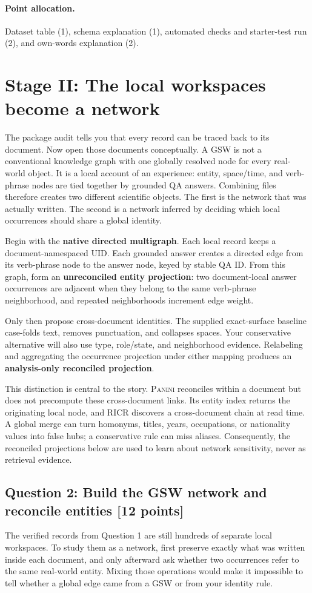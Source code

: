 \documentclass[11pt]{article}
\newcommand{\RICR}{{\mdseries\textsc{RICR}}\xspace}
\newcommand{\PANINI}{{\mdseries\textsc{Panini}}\xspace}
\newcommand{\question}[3]{%
  \subsection[Question #1: #2 (#3 points)]{Question #1: #2 \hfill [#3 points]}%
}
\newcommand{\grading}{\paragraph{Point allocation.}}
\begin{document}
\grading Dataset table (1), schema explanation (1), automated checks and
starter-test run (2), and own-words explanation (2).

\section{Stage II: The local workspaces become a network}

The package audit tells you that every record can be traced back to its
document. Now open those documents conceptually. A GSW is not a conventional
knowledge graph with one globally resolved node for every real-world object.
It is a local account of an experience: entity, space/time, and verb-phrase
nodes are tied together by grounded QA answers. Combining files therefore
creates two different scientific objects. The first is the network that was
actually written. The second is a network inferred by deciding which local
occurrences should share a global identity.

Begin with the \textbf{native directed multigraph}. Each local record keeps a
document-namespaced UID. Each grounded answer creates a directed edge from its
verb-phrase node to the answer node, keyed by stable QA ID. From this graph,
form an \textbf{unreconciled entity projection}: two document-local answer
occurrences are adjacent when they belong to the same verb-phrase
neighborhood, and repeated neighborhoods increment edge weight.

Only then propose cross-document identities. The supplied exact-surface
baseline case-folds text, removes punctuation, and collapses spaces. Your
conservative alternative will also use type, role/state, and neighborhood
evidence. Relabeling and aggregating the occurrence projection under either
mapping produces an \textbf{analysis-only reconciled projection}.

This distinction is central to the story. \PANINI reconciles within a document
but does not precompute these cross-document links. Its entity index returns
the originating local node, and \RICR discovers a cross-document chain at read
time. A global merge can turn homonyms, titles, years, occupations, or
nationality values into false hubs; a conservative rule can miss aliases.
Consequently, the reconciled projections below are used to learn about
network sensitivity, never as retrieval evidence.

\question{2}{Build the GSW network and reconcile entities}{12}

The verified records from Question 1 are still hundreds of separate local
workspaces. To study them as a network, first preserve exactly what was written
inside each document, and only afterward ask whether two occurrences refer to
the same real-world entity. Mixing those operations would make it impossible
to tell whether a global edge came from a GSW or from your identity rule.
\end{document}

